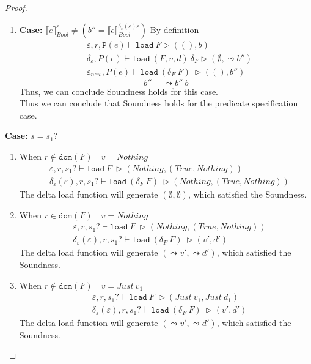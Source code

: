 \documentclass[10pt,twoside,a4paper]{article}
\theoremstyle{theorem}
\theoremstyle{lemma}
\theoremstyle{property}
\theoremstyle{definition}
\theoremstyle{assumption}
\def\newenv{\delta_\varepsilon(\varepsilon)}
\begin{document}
\begin{proof}
\begin{enumerate}
	\item
	\textbf{Case: } $\llbracket e \rrbracket^{\varepsilon}_{Bool} \not= ( b'' = \llbracket e \rrbracket^{\delta_\varepsilon(\varepsilon) \varepsilon}_{Bool})$
	By definition
	\begin{align*}
		& \varepsilon, r, \mathtt{P}(e) \vdash \mathtt{load}~F \rhd ((),b)\\
		& \delta_\varepsilon, P(e) \vdash \mathtt{load}~ (F,v,d)~ \delta_F \rhd (\emptyset, \leadsto b'')\\
		& \varepsilon_{new}, P(e) \vdash \mathtt{load}~ (\delta_F~F)~ \rhd ((),b'')
	\end{align*}
	\begin{displaymath}
		b'' = \leadsto b'' ~b
	\end{displaymath}
	Thus, we can conclude Soundness holds for this case.\\
	Thus we can conclude that Soundness holds for the predicate specification case.
	\end{enumerate}

	\textbf{Case: } $s = s_1?$\\
	\begin{enumerate}
	\item
	When $r \notin \mathtt{dom}(F) \quad v = Nothing$
	\begin{align*}
		& \varepsilon, r, s_1? \vdash \mathtt{load}~ F~ \rhd (Nothing,(True, Nothing))\\
		& \newenv, r, s_1? \vdash \mathtt{load}~ (\delta_F~F)~ \rhd (Nothing,(True, Nothing))
	\end{align*}
	The delta load function will generate $(\emptyset, \emptyset)$, which satisfied the Soundness.

	\item
	When $r \in \mathtt{dom}(F) \quad v = Nothing$
	\begin{align*}
		& \varepsilon, r, s_1? \vdash \mathtt{load}~ F~ \rhd (Nothing,(True, Nothing))\\
		& \newenv, r, s_1? \vdash \mathtt{load}~ (\delta_F~F)~ \rhd (v', d')
	\end{align*}
	The delta load function will generate $(\leadsto v', \leadsto d')$, which satisfied the Soundness.

	\item
	When $r \notin \mathtt{dom}(F) \quad v = Just~ v_1$
	\begin{align*}
		& \varepsilon, r, s_1? \vdash \mathtt{load}~ F~ \rhd (Just ~v_1, Just ~d_1)\\
		& \newenv, r, s_1? \vdash \mathtt{load}~ (\delta_F~F)~ \rhd (v', d')
	\end{align*}
	The delta load function will generate $(\leadsto v', \leadsto d')$, which satisfied the Soundness.


\end{enumerate}
\end{proof}
\end{document}
